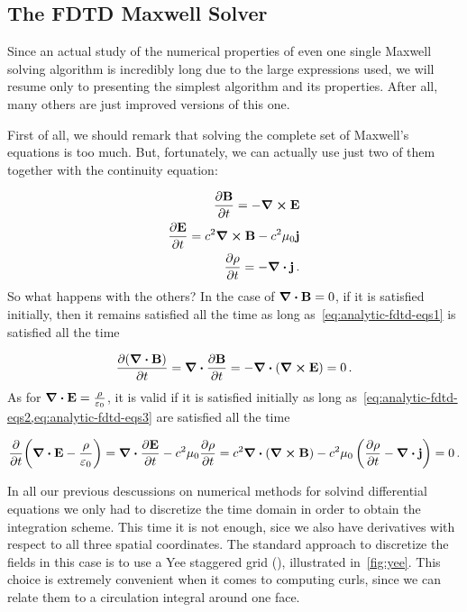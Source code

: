 \documentclass[12pt, class=report, crop=false]{standalone}
\begin{document}
\subsection{The FDTD Maxwell Solver}
Since an actual study of the numerical properties of even one single Maxwell solving algorithm is incredibly long due to the large expressions used, we will resume only to presenting the simplest algorithm and its properties. After all, many others are just improved versions of this one.

First of all, we should remark that solving the complete set of Maxwell's equations is too much. But, fortunately, we can actually use just two of them together with the continuity equation:

\begin{subequations}
  \begin{align}
    \label{eq:analytic-fdtd-eqs1}
    \pdv{\vb{B}}{t} = - \curl{\vb{E}}\\
    \label{eq:analytic-fdtd-eqs2}
    \pdv{\vb{E}}{t} = c^2 \curl{\vb{B}} - c^2 \mu_0 \vb{j}\\
    \label{eq:analytic-fdtd-eqs3}
    \pdv{\rho}{t} = - \div{\vb{j}}\,.
  \end{align}
\end{subequations}
So what happens with the others? In the case of \(\div{\vb{B}} = 0\), if it is satisfied initially, then it remains satisfied all the time as long as~\cref{eq:analytic-fdtd-eqs1} is satisfied all the time

\begin{equation*}
  \pdv{(\div{\vb{B}})}{t} = \div{\pdv{\vb{B}}{t}} = - \div{(\curl{\vb{E}})} = 0\,.
\end{equation*}
As for \(\div{\vb{E}} = \frac{\rho}{\varepsilon_0}\), it is valid if it is satisfied initially as long as~\cref{eq:analytic-fdtd-eqs2,eq:analytic-fdtd-eqs3} are satisfied all the time

\begin{equation*}
  \pdv{t} (\div{\vb{E}} - \frac{\rho}{\varepsilon_0}) = \div{\pdv{\vb{E}}{t}} - c^2 \mu_0 \pdv{\rho}{t} = c^2 \div{(\curl{\vb{B}})} - c^2 \mu_0 \left(\pdv{\rho}{t} - \div{\vb{j}}\right) = 0\,.
\end{equation*}

In all our previous descussions on numerical methods for solvind differential equations we only had to discretize the time domain in order to obtain the integration scheme. This time it is not enough, sice we also have derivatives with respect to all three spatial coordinates. The standard approach to discretize the fields in this case is to use a Yee staggered grid (\cite{kaneyeeNumericalSolutionInitial1966}), illustrated in~\cref{fig:yee}. This choice is extremely convenient when it comes to computing curls, since we can relate them to a circulation integral around one face.
\end{document}
